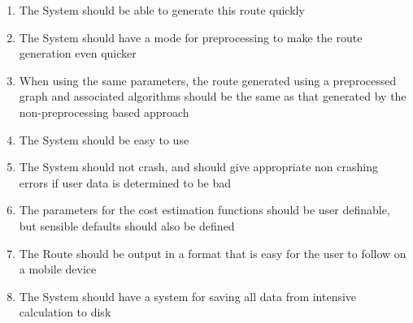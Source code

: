 \documentclass[11pt,twoside,a4paper]{report}
\begin{document}
\begin{enumerate}
\begin{enumerate}[label=\arabic{enumi}.\arabic*]
    \item \label{item-nine}The System should be able to generate this route quickly
    \item \label{item-ten}The System should have a mode for preprocessing to make the route generation even quicker
    \item \label{item-eleven}When using the same parameters, the route generated using a preprocessed graph and associated algorithms should be the same as that generated by the non-preprocessing based approach
    \item \label{item-twelve}The System should be easy to use
    \item \label{nocrashy} \label{item-thirteen}The System should not crash, and should give appropriate non crashing errors if user data is determined to be bad
    \item \label{item-fourteen} The parameters for the cost estimation functions should be user definable, but sensible defaults should also be defined
    \item \label{item-fifteen}\label{followpossible}The Route should be output in a format that is easy for the user to follow on a mobile device
    \item \label{item-sixteen}The System should have a system for saving all data from intensive calculation to disk
\end{enumerate}
\end{enumerate}
\newpage
\end{document}
